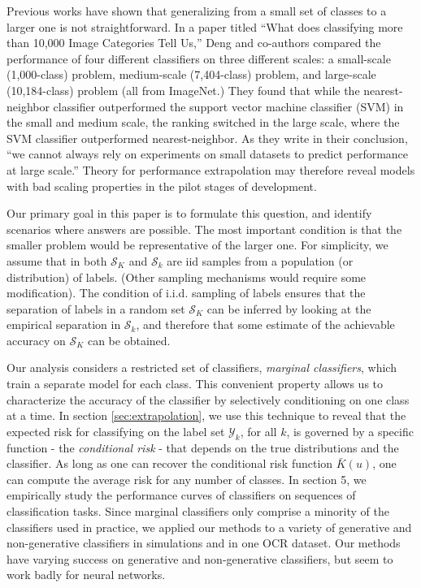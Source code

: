 \documentclass[12pt]{article}
\begin{document}
Previous works have shown that generalizing from a small set of classes 
to a larger one is not straightforward. In a paper titled ``What
does classifying more than 10,000 Image Categories Tell Us,'' Deng and
co-authors compared the performance of four different classifiers on
three different scales: a small-scale (1,000-class) problem,
medium-scale (7,404-class) problem, and large-scale (10,184-class)
problem (all from ImageNet.)  They found that while the
nearest-neighbor classifier outperformed the support vector machine
classifier (SVM) in the small and medium scale, the ranking switched
in the large scale, where the SVM classifier outperformed
nearest-neighbor.  As they write in their conclusion, ``we cannot
always rely on experiments on small datasets to predict performance at
large scale.'' Theory for performance
extrapolation may therefore reveal models with bad scaling properties in the
pilot stages of development.

Our primary goal in this paper is to formulate this question, and
identify scenarios where answers are possible. 
The most important condition is that the smaller problem would be 
representative of the larger one. For simplicity, we
assume that in both $\mathcal{S}_K$ and $\mathcal{S}_k$ are iid samples
from a population (or distribution) of labels. (Other sampling 
mechanisms would require some modification). 
The condition of i.i.d. sampling of labels ensures that the
separation of labels in a random set $\mathcal{S}_K$ can be inferred by
looking at the empirical separation in $\mathcal{S}_k$, and
therefore that some estimate of the achievable accuracy on
$\mathcal{S}_K$ can be obtained.

Our analysis considers a restricted set of classifiers,
\emph{marginal classifiers}, which train a separate model for each class. 
This convenient property allows us to
characterize the accuracy of the classifier by selectively
conditioning on one class at a time.  In section \ref{sec:extrapolation}, we use this
technique to reveal that the expected risk for classifying on the
label set $\mathcal{Y}_k$, for all $k$, is governed by a
specific function - the \emph{conditional risk} -  
that depends on the true distributions and the classifier. 
As long as one can recover the conditional risk
function $\bar{K}(u)$, one can compute the average risk for any number
of classes. 
  In section 5, we
empirically study the performance curves of classifiers on sequences
of classification tasks.  Since marginal classifiers only comprise a
minority of the classifiers used in practice, we applied our methods
to a variety of generative and non-generative classifiers in
simulations and in one OCR dataset.  Our methods have varying success
on generative and non-generative classifiers, but seem to work badly
for neural networks.
\end{document}
